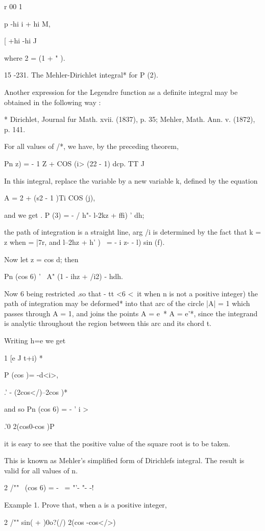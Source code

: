 {{r 00 1

p -hi i + hi M,

[ +hi -hi J

where 2 = (1 + " ).

15 -231. The Mehler-Dirichlet integral* for P (2).

Another expression for the Legendre function as a definite integral
may be obtained in the following way :

* Dirichlet, Journal fur Math. xvii. (1837), p. 35; Mehler, Math. Ann.
v. (1872), p. 141.

%
%

For all values of /*, we have, by the preceding theorem,

Pn z) = - 1 Z + COS (i> (22 - 1) dcp. TT J

In this integral, replace the variable by a new variable k, defined by
the equation

A = 2 + (s2 - 1 )Ti COS (j),

and we get . P (3) = - / h"- l-2kz + ffi) ' dh;

the path of integration is a straight line, arg /i is determined by
the fact that k = z when = |7r, and l--2hz + h' )~ = - i z- - l) sin
(f).

Now let z = cos d; then

Pn (cos 6) ' \ A" (1 - ihz + /i2) - hdh.

Now 6 being restricted .so that - tt <6 <\ it when n is not a positive
integer) the path of integration may be deformed* into that arc of the
circle |A| = 1 which passes through A = 1, and joins the points A =
e~* A = e'*, since the integrand is analytic throughout the region
between this arc and its chord t.

Writing h=e we get

1 [e J t+i) *

P (cos )= -d<i>,

  .' - (2cos</)--2cos )*

and so Pn (cos 6) = - ' i >

 .'0 2(cos0-cos )P

it is easy to see that the positive value of the square root is to be
taken.

This is known as Mehler's simplified form of Dirichlefs integral. The
result is valid for all values of n.

2 /"" \ (cos 6) = - \ = "'- "- -! 

Example 1. Prove that, when a is a positive integer,

2 /"" sin( + )0o?(/) 2(cos -cos</>)

}}
